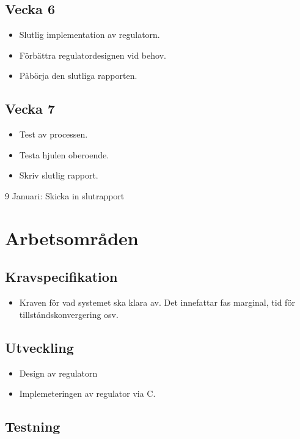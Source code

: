 \documentclass[a4paper]{article}
\begin{document}
    \subsection*{Vecka 6}
    \begin{itemize}
	\item Slutlig implementation av regulatorn.
    \item Förbättra regulatordesignen vid behov.
    \item Påbörja den slutliga rapporten.
	\end{itemize}
    
    \subsection*{Vecka 7}
    \begin{itemize}
	\item Test av processen.
    \item Testa hjulen oberoende.
    \item Skriv slutlig rapport.
	\end{itemize}

9 Januari: Skicka in slutrapport

\section{Arbetsområden}
	
    \subsection*{Kravspecifikation}

    \begin{itemize}
    \item [] Kraven för vad systemet ska klara av. Det innefattar fas marginal, tid för tillståndskonvergering osv.
    \end{itemize}
    
    \subsection*{Utveckling}
    
    \begin{itemize}
    \item [] Design av regulatorn
    \item [] Implemeteringen av regulator via C.
    \end{itemize}
    
    \subsection*{Testning}
    
\end{document}

